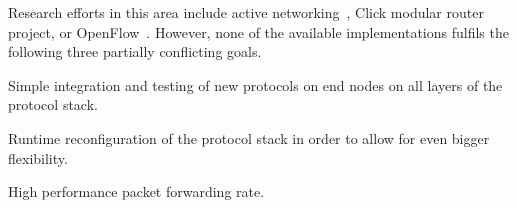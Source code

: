 \documentclass{sig-alternate}
\begin{document}
Research efforts in this area include active networking~\cite{ANSurvey2}, Click
modular router project\cite{click}, or OpenFlow~\cite{openflow}. However, none
of the available implementations fulfils the following three partially
conflicting goals. 
\begin{compactenum}
\item Simple integration and testing of new protocols on end nodes on all layers of the protocol stack.
\item Runtime reconfiguration of the protocol stack in order to allow for even bigger flexibility.
\item High performance packet forwarding rate.
\end{compactenum}
\end{document}
